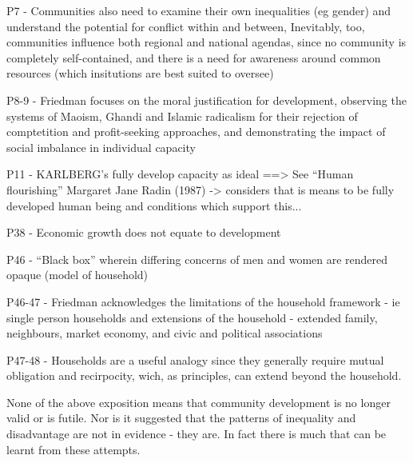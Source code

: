 P7 - Communities also need to examine their own inequalities (eg gender) and understand the potential for conflict within and between, Inevitably, too, communities influence both regional and national agendas, since no community is completely self-contained, and there is a need for awareness around common resources (which insitutions are best suited to oversee) \cite{Friedmann1992}


P8-9 - Friedman focuses on the moral justification for development, observing the systems of Maoism, Ghandi and Islamic radicalism for their rejection of comptetition and profit-seeking approaches, and demonstrating the impact of social imbalance in individual capacity \cite{Friedmann1992}


P11 - KARLBERG's fully develop capacity as ideal ==> See “Human flourishing” Margaret Jane Radin (1987) -> considers that is means to be fully developed human being and conditions which support this... \cite{Friedmann1992}

P38 - Economic growth does not equate to development \cite{Friedmann1992}

P46 - “Black box” wherein differing concerns of men and women are rendered opaque (model of household) \cite{Friedmann1992}

P46-47 - Friedman acknowledges the limitations of the household framework - ie single person households and extensions of the household - extended family, neighbours, market economy, and civic and political associations \cite{Friedmann1992}

P47-48 - Households are a useful analogy since they generally require mutual obligation and recirpocity, wich, as principles, can extend beyond the household.\cite{Friedmann1992}




None of the above exposition means that community development is no longer valid or is futile. Nor is it suggested that the patterns of inequality and disadvantage are not in evidence - they are. In fact there is much that can be learnt from these attempts. 





